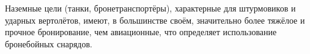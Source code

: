 \documentclass[11pt]{article}
\begin{document}



Наземные цели (танки, бронетранспортёры), характерные для штурмовиков и ударных вертолётов, имеют, в большинстве своём, значительно более тяжёлое и прочное бронирование, чем авиационные, что определяет использование бронебойных снарядов.






\end{document}
